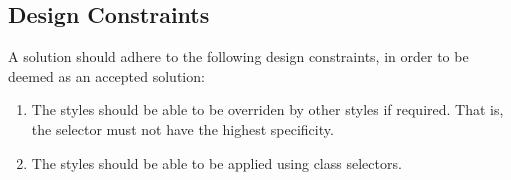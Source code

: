 \documentclass[12pt]{article}
\begin{document}





\subsection{Design Constraints}
A solution should adhere to the following design constraints, in order to be deemed as an accepted solution:
\begin{enumerate}

	\item The styles should be able to be overriden by other styles if required. That is, the selector must not have the highest specificity.

	\item The styles should be able to be applied using class selectors.

\end{enumerate}
\end{document}
